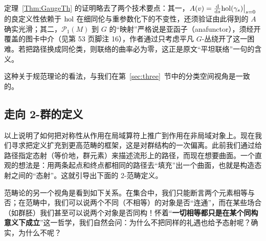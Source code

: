 \begin{yizhu}
定理~\ref{Thm:GaugeTh} 的证明略去了两个技术要点：其一，$A(v)=\frac{\rm d}{{\rm d}s}{\rm hol}(\gamma_s)\big|_{s=0}$ 的良定义性依赖于 ${\rm hol}$ 在细同伦与重参数化下的不变性，还须验证由此得到的 $A$ 确实光滑；其二，$\mathcal{P}_1(M)$ 到 $G$ 的“映射”严格说是亚函子（anafunctor），须经开覆盖的图卡中介（见第 53 页脚注 16），作者通过只考虑平凡 $G$-丛绕开了这一困难。若把路径换成同伦类，则联络的曲率必为零，这正是原文“平坦联络”一句的含义。
\end{yizhu}

这种关于规范理论的看法，与我们在第~\ref{sec:three}~节中的分类空间视角是一致的。

\subsection{走向 2-群的定义}\label{sec:2-group}

以上说明了如何把对称性从作用在局域算符上推广到作用在非局域对象上。现在我们寻求把定义扩充到更高范畴的框架，这是对群结构的一次偏离。此前我们通过给路径指定态射（等价地，群元素）来描述流形上的路径，而现在想要曲面。一个直观的想法是：用两条起点和终点都相同的路径去“填充”出一个曲面，也就是构造态射之间的“态射”。这就引导出下面的 2-范畴定义。

范畴论的另一个视角是看到如下关系。在集合中，我们只能断言两个元素相等与否；在范畴中，我们可以说两个不同（不相等）的对象是否“连通”，而在某些场合（如群胚）我们甚至可以说两个对象是否同构！怀着“\textbf{一切相等都只是在某个同构意义下成立}”这一哲学，我们自然会问：为什么不把同样的礼遇也给予态射呢？确实，为什么不呢？

